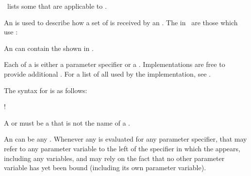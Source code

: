 \Thenextfigure\ lists some  that are applicable
to .




An  is used to describe how a set of
 is received by an  .  
The  in \thenextfigure\ are those which use
:


An  can contain the  shown
in \thenextfigure.


Each  of a  is either a parameter specifier
or a .
Implementations are free to provide additional .
For a list of all 
used by the implementation, see .

The syntax for  is as follows: 

\Vskip 1pc!

A  or  must be a 
that is not the name of a .

An  can be any .
Whenever any  is evaluated for any parameter
specifier, that  may refer to any parameter variable to
the left of the specifier in which the  appears,
including any  variables, and may rely 
on the fact that no other parameter variable has yet been bound
(including its own parameter variable).

